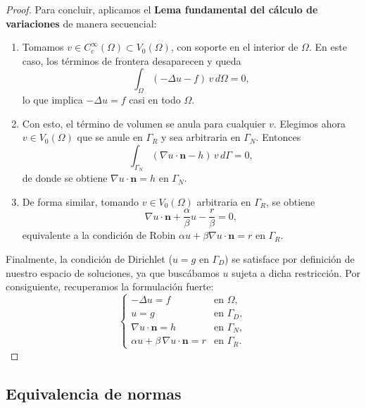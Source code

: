 \documentclass[11pt]{book}
\theoremstyle{plain} %
\theoremstyle{definition} %
\theoremstyle{definition} %
\begin{document}
\begin{proof}
Para concluir, aplicamos el \textbf{Lema fundamental del cálculo de variaciones} de manera secuencial:
\begin{enumerate}
    \item Tomamos $v \in C_c^\infty(\Omega) \subset V_0(\Omega)$, con soporte en el interior de $\Omega$. En este caso, los términos de frontera desaparecen y queda
    \[
    \int_\Omega (-\Delta u - f)\, v \, d\Omega = 0,
    \]
    lo que implica $-\Delta u = f$ casi en todo $\Omega$.

    \item Con esto, el término de volumen se anula para cualquier $v$. Elegimos ahora $v \in V_0(\Omega)$ que se anule en $\Gamma_R$ y sea arbitraria en $\Gamma_N$. Entonces
    \[
    \int_{\Gamma_N} (\nabla u \cdot \mathbf{n} - h)\, v \, d\Gamma = 0,
    \]
    de donde se obtiene $\nabla u \cdot \mathbf{n} = h$ en $\Gamma_N$.

    \item De forma similar, tomando $v \in V_0(\Omega)$ arbitraria en $\Gamma_R$, se obtiene
    \[
    \nabla u \cdot \mathbf{n} + \frac{\alpha}{\beta}u - \frac{r}{\beta} = 0,
    \]
    equivalente a la condición de Robin $\alpha u + \beta \nabla u \cdot \mathbf{n} = r$ en $\Gamma_R$.
\end{enumerate}

Finalmente, la condición de Dirichlet ($u=g$ en $\Gamma_D$) se satisface por definición de nuestro espacio de soluciones, ya que buscábamos $u$ sujeta a dicha restricción. Por consiguiente, recuperamos la formulación fuerte:
\begin{equation*}
\begin{cases}
- \Delta u = f & \text{en } \Omega, \\[6pt]
u = g & \text{en } \Gamma_D, \\[6pt]
\nabla u \cdot \mathbf{n} = h & \text{en } \Gamma_N, \\[6pt]
\alpha u + \beta \, \nabla u \cdot \mathbf{n} = r & \text{en } \Gamma_R.
\end{cases}
\end{equation*}
\end{proof}
\subsection{Equivalencia de normas}
\label{sec:normas}
\end{document}
